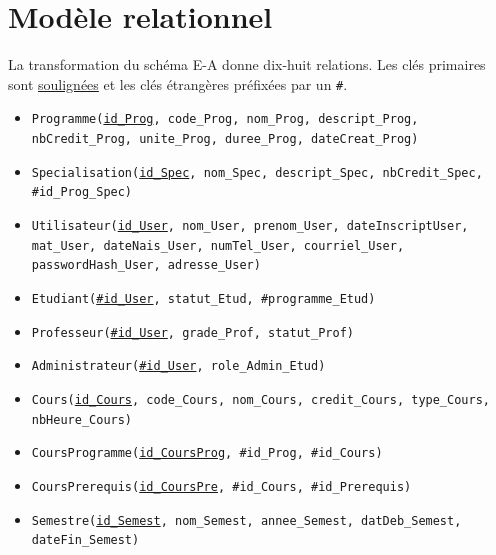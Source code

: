 \documentclass[11pt,a4paper]{article}
\begin{document}
\section{Modèle relationnel}

La transformation du schéma E-A donne dix-huit relations. Les clés
primaires sont \underline{soulignées} et les clés étrangères préfixées
par un \texttt{\#}.

\begin{itemize}\small
    \item \texttt{Programme(\underline{id\_Prog}, code\_Prog, nom\_Prog,
        descript\_Prog, nbCredit\_Prog, unite\_Prog, duree\_Prog,
        dateCreat\_Prog)}

    \item \texttt{Specialisation(\underline{id\_Spec}, nom\_Spec,
        descript\_Spec, nbCredit\_Spec, \#id\_Prog\_Spec)}

    \item \texttt{Utilisateur(\underline{id\_User}, nom\_User, prenom\_User,
        dateInscriptUser, mat\_User, dateNais\_User, numTel\_User,
        courriel\_User, passwordHash\_User, adresse\_User)}

    \item \texttt{Etudiant(\underline{\#id\_User}, statut\_Etud,
        \#programme\_Etud)}

    \item \texttt{Professeur(\underline{\#id\_User}, grade\_Prof,
        statut\_Prof)}

    \item \texttt{Administrateur(\underline{\#id\_User},
        role\_Admin\_Etud)}

    \item \texttt{Cours(\underline{id\_Cours}, code\_Cours, nom\_Cours,
        credit\_Cours, type\_Cours, nbHeure\_Cours)}

    \item \texttt{CoursProgramme(\underline{id\_CoursProg}, \#id\_Prog,
        \#id\_Cours)}

    \item \texttt{CoursPrerequis(\underline{id\_CoursPre}, \#id\_Cours,
        \#id\_Prerequis)}

    \item \texttt{Semestre(\underline{id\_Semest}, nom\_Semest,
        annee\_Semest, datDeb\_Semest, dateFin\_Semest)}


\end{itemize}
\end{document}
